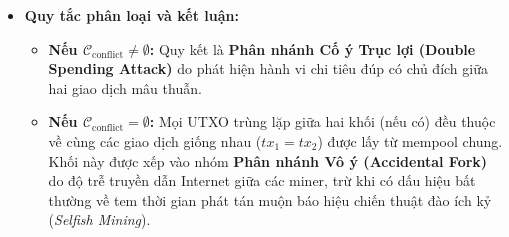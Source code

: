 \documentclass[11pt,a4paper]{article}
\begin{document}
\begin{enumerate}
\begin{itemize}
        Hành vi chi tiêu đúp chỉ thực sự phát sinh khi tồn tại \textbf{hai giao dịch khác biệt} ($tx_1 \neq tx_2$) nhưng lại cùng tranh chấp ít nhất \textbf{một UTXO đầu vào}. Do đó, điều kiện logic để phát hiện xung đột là:
        \begin{equation}
            \exists \, tx_1 \in B_1, \; tx_2 \in B_2 \quad \text{sao cho} \quad (tx_1 \neq tx_2) \land \big(\text{inputs}(tx_1) \cap \text{inputs}(tx_2) \neq \emptyset\big).
        \end{equation}
        Tập các UTXO bị tranh chấp chi tiêu đúp $\mathcal{C}_{\text{conflict}}$ được chuẩn hóa như sau:
        \begin{equation}
            \begin{split}
                \mathcal{C}_{\text{conflict}} = \big\{ u \in \text{UTXO} \;\big\vert{}\; & \exists tx_1 \in B_1, \exists tx_2 \in B_2: \\
                & (tx_1 \neq tx_2) \land u \in \big(\text{inputs}(tx_1) \cap \text{inputs}(tx_2)\big) \big\}.
            \end{split}
        \end{equation}
        \item \textbf{Quy tắc phân loại và kết luận:}
        \begin{itemize}
            \item \textbf{Nếu $\mathcal{C}_{\text{conflict}} \neq \emptyset$:} Quy kết là \textbf{Phân nhánh Cố ý Trục lợi (Double Spending Attack)} do phát hiện hành vi chi tiêu đúp có chủ đích giữa hai giao dịch mâu thuẫn.
            \item \textbf{Nếu $\mathcal{C}_{\text{conflict}} = \emptyset$:} Mọi UTXO trùng lặp giữa hai khối (nếu có) đều thuộc về cùng các giao dịch giống nhau ($tx_1 = tx_2$) được lấy từ mempool chung. Khối này được xếp vào nhóm \textbf{Phân nhánh Vô ý (Accidental Fork)} do độ trễ truyền dẫn Internet giữa các miner, trừ khi có dấu hiệu bất thường về tem thời gian phát tán muộn báo hiệu chiến thuật đào ích kỷ (\textit{Selfish Mining}).
        \end{itemize}
    \end{itemize}
\end{enumerate}
\end{document}
